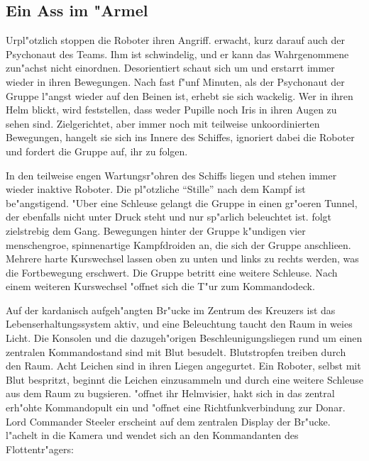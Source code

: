 \subsection{Ein Ass im "Armel}
Urpl"otzlich stoppen die Roboter ihren Angriff. \xl{} erwacht, kurz darauf auch der Psychonaut des Teams. Ihm ist schwindelig, und er kann das Wahrgenommene zun"achst nicht einordnen. Desorientiert schaut sich \xl{} um und erstarrt immer wieder in ihren Bewegungen. Nach fast f"unf Minuten, als der Psychonaut der Gruppe l"angst wieder auf den Beinen ist, erhebt sie sich wackelig. Wer in ihren Helm blickt, wird feststellen, dass weder Pupille noch Iris in ihren Augen zu sehen sind. Zielgerichtet, aber immer noch mit teilweise unkoordinierten Bewegungen, hangelt sie sich ins Innere des Schiffes, ignoriert dabei die Roboter und fordert die Gruppe auf, ihr zu folgen.


In den teilweise engen Wartungsr"ohren des Schiffs liegen und stehen immer wieder inaktive Roboter. Die pl"otzliche "`Stille"' nach dem Kampf ist be"angstigend. "Uber eine Schleuse gelangt die Gruppe in einen gr"o\3eren Tunnel, der ebenfalls nicht unter Druck steht und nur sp"arlich beleuchtet ist. \xl{} folgt zielstrebig dem Gang. Bewegungen hinter der Gruppe k"undigen vier menschengro\3e, spinnenartige Kampfdroiden an, die sich der Gruppe anschlie\3en. Mehrere harte Kurswechsel lassen oben zu unten und links zu rechts werden, was die Fortbewegung erschwert. Die Gruppe betritt eine weitere Schleuse. Nach einem weiteren Kurswechsel "offnet sich die T"ur zum Kommandodeck.

Auf der kardanisch aufgeh"angten Br"ucke im Zentrum des Kreuzers ist das Lebenserhaltungssystem aktiv, und eine Beleuchtung taucht den Raum in wei\3es Licht. Die Konsolen und die dazugeh"origen Beschleunigungsliegen rund um einen zentralen Kommandostand sind mit Blut besudelt. Blutstropfen treiben durch den Raum. Acht Leichen sind in ihren Liegen angegurtet. Ein Roboter, selbst mit Blut bespritzt, beginnt die Leichen einzusammeln und durch eine weitere Schleuse aus dem Raum zu bugsieren. \xl{} "offnet ihr Helmvisier, hakt sich in das zentral erh"ohte Kommandopult ein und "offnet eine Richtfunkverbindung zur Donar. Lord Commander Steeler erscheint auf dem zentralen Display der Br"ucke. \xl{} l"achelt in die Kamera und wendet sich an den Kommandanten des Flottentr"agers:


